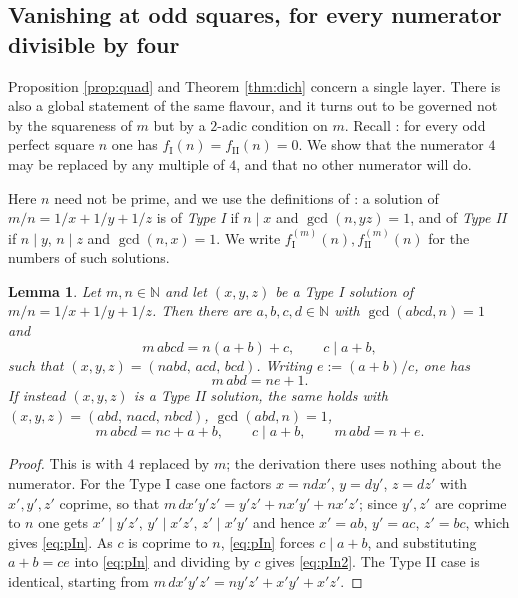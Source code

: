 \documentclass[11pt,reqno]{amsart}
\theoremstyle{plain}
\newtheorem{lemma}[theorem]{Lemma}
\theoremstyle{definition}
\numberwithin{equation}{section}
\newcommand{\N}{\mathbb{N}}
\newcommand{\fI}{f_{\mathrm{I}}}
\newcommand{\fII}{f_{\mathrm{II}}}
\begin{document}
\subsection{Vanishing at odd squares, for every numerator divisible by four}
\label{sec:vanish}
Proposition \ref{prop:quad} and Theorem \ref{thm:dich} concern a single layer. There is
also a global statement of the same flavour, and it turns out to be governed not by the
squareness of $m$ but by a $2$-adic condition on $m$. Recall
\cite[Prop.~1.6]{ElsholtzTao}: for every odd perfect square $n$ one has
$\fI(n)=\fII(n)=0$. We show that the numerator $4$ may be replaced by any multiple
of $4$, and that no other numerator will do.

Here $n$ need not be prime, and we use the definitions of \cite[\S2]{ElsholtzTao}: a
solution of $m/n=1/x+1/y+1/z$ is of \emph{Type I} if $n\mid x$ and $\gcd(n,yz)=1$, and
of \emph{Type II} if $n\mid y$, $n\mid z$ and $\gcd(n,x)=1$. We write
$\fI^{(m)}(n),\fII^{(m)}(n)$ for the numbers of such solutions.

\begin{lemma}\label{lem:paramn}
Let $m,n\in\N$ and let $(x,y,z)$ be a Type I solution of $m/n=1/x+1/y+1/z$. Then there
are $a,b,c,d\in\N$ with $\gcd(abcd,n)=1$ and
\begin{equation}\label{eq:pIn}
  m\,abcd=n(a+b)+c,\qquad c\mid a+b,
\end{equation}
such that $(x,y,z)=(nabd,\,acd,\,bcd)$. Writing $e:=(a+b)/c$, one has
\begin{equation}\label{eq:pIn2}
  m\,abd=ne+1 .
\end{equation}
If instead $(x,y,z)$ is a Type II solution, the same holds with
$(x,y,z)=(abd,\,nacd,\,nbcd)$, $\gcd(abd,n)=1$,
\begin{equation}\label{eq:pIIn}
  m\,abcd=nc+a+b,\qquad c\mid a+b,\qquad m\,abd=n+e .
\end{equation}
\end{lemma}

\begin{proof}
This is \cite[Prop.~2.2 and 2.6]{ElsholtzTao} with $4$ replaced by $m$; the derivation
there uses nothing about the numerator. For the Type I case one factors $x=ndx'$,
$y=dy'$, $z=dz'$ with $x',y',z'$ coprime, so that
$m\,dx'y'z'=y'z'+nx'y'+nx'z'$; since $y',z'$ are coprime to $n$ one gets
$x'\mid y'z'$, $y'\mid x'z'$, $z'\mid x'y'$ and hence $x'=ab$, $y'=ac$, $z'=bc$,
which gives \eqref{eq:pIn}. As $c$ is coprime to $n$, \eqref{eq:pIn} forces
$c\mid a+b$, and substituting $a+b=ce$ into \eqref{eq:pIn} and dividing by $c$ gives
\eqref{eq:pIn2}. The Type II case is identical, starting from
$m\,dx'y'z'=ny'z'+x'y'+x'z'$.
\end{proof}
\end{document}
